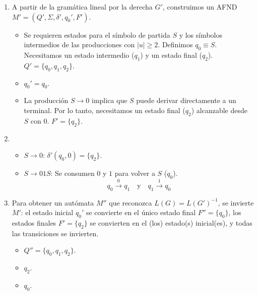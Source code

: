 \begin{solucion}
\begin{enumerate}
\begin{enumerate}
        \item {}

        A partir de la gramática lineal por la derecha $G'$, construimos un AFND $M' = (Q', \Sigma, \delta', q_0', F')$.

        \begin{itemize}
            \item {} Se requieren estados para el símbolo de partida $S$ y los símbolos intermedios de las producciones con $|u| \geq 2$. Definimos $q_0 \equiv S$. Necesitamos un estado intermedio ($q_1$) y un estado final ($q_2$). $Q' = \{q_0, q_1, q_2\}$.
            \item {} $q_0' = q_0$.
            \item {} La producción $S \to 0$ implica que $S$ puede derivar directamente a un terminal. Por lo tanto, necesitamos un estado final ($q_2$) alcanzable desde $S$ con $0$. $F' = \{q_2\}$.
        \end{itemize}

        \item {}
        \begin{itemize}
            \item $S \to 0$: $\delta'(q_0, 0) = \{q_2\}$.
            \item $S \to 01S$: Se consumen $0$ y $1$ para volver a $S$ ($q_0$).
            $$
            q_0 \stackrel{0}{\to} q_1 \quad \text{y} \quad q_1 \stackrel{1}{\to} q_0
            $$
        \end{itemize}

        \item {}

        Para obtener un autómata $M''$ que reconozca $L(G) = L(G')^{-1}$, se invierte $M'$: el estado inicial $q_0'$ se convierte en el único estado final $F''=\{q_0\}$, los estados finales $F'=\{q_2\}$ se convierten en el (los) estado(s) inicial(es), y todas las transiciones se invierten.

        \begin{itemize}
            \item {} $Q'' = \{q_0, q_1, q_2\}$.
            \item {} $q_2$.
            \item {} $q_0$.
        \end{itemize}


\end{enumerate}
\end{enumerate}
\end{solucion}
